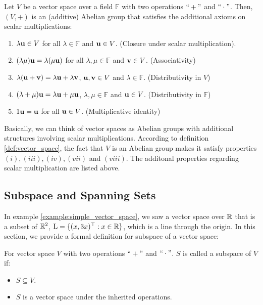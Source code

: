 \begin{definition}
	Let $V$ be a vector space over a field $\mathbb{F}$ with two operations $``+"$ and $``\cdot"$. Then, $(V, +)$ is an (additive) Abelian group that satisfies the additional axioms on scalar multiplications:
	\begin{enumerate}[label=\roman*]
		\item  $\lambda {\bf u} \in V$ for all $\lambda\in\mathbb{F}$ and ${\bf u}\in V$. \hfill (Closure under scalar multiplication).
		\item $(\lambda\mu){\bf u} = \lambda(\mu{\bf u})$ for all $\lambda, \mu\in\mathbb{F}$ and ${\bf v}\in V$. \hfill (Associativity)
		\item $\lambda({\bf u} + {\bf v}) = \lambda{\bf u} + \lambda{\bf v}$, ${\bf u}, {\bf v}\in V$ and $\lambda\in\mathbb{F}$. \hfill (Distributivity in $V$)
		\item $(\lambda + \mu){\bf u} = \lambda{\bf u} + \mu{\bf u}$, $\lambda, \mu\in\mathbb{F}$ and ${\bf u}\in V$. \hfill (Distributivity in $\mathbb{F}$)
		\item $1{\bf u} = {\bf u}$ for all ${\bf u}\in V$. \hfill (Multiplicative identity)
	\end{enumerate} 

	\noindent Basically, we can think of vector spaces as Abelian groups with additional structures involving scalar multiplications. According to definition \ref{def:vector_space}, the fact that $V$ is an Abelian group makes it satisfy properties $(i), (iii), (iv), (vii)$ and $(viii)$. The additonal properties regarding scalar multiplication are listed above.
\end{definition} 

\subsection{Subspace and Spanning Sets}
In example \ref{example:simple_vector_space}, we saw a vector space over $\mathbb{R}$ that is a subset of $\mathbb{R}^2$, $\mathrm{L}=\{(x, 3x)^\top : x\in\mathbb{R}\}$, which is a line through the origin. In this section, we provide a formal definition for subspace of a vector space:
\begin{definition}[Subspace]
	For vector space $V$ with two operations $``+"$ and $``\cdot"$. $S$ is called a subspace of $V$ if:
	\begin{itemize}
		\item $S\subseteq V$.
		\item $S$ is a vector space under the inherited operations.	
	\end{itemize} 	
\end{definition} 


